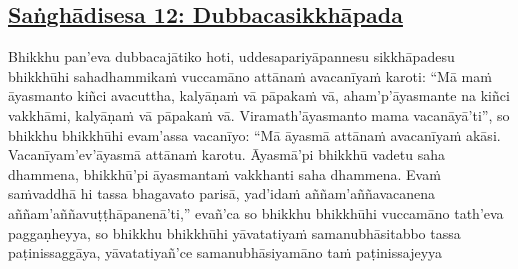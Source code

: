 


\subsection*{\hyperref[comm12]{Saṅghādisesa 12: Dubbacasikkhāpada}}
\label{sd12}

Bhikkhu pan'eva dubbacajātiko hoti, uddesapariyāpannesu sikkhāpadesu bhikkhūhi sahadhammikaṁ vuccamāno attānaṁ avacanīyaṁ karoti: ``Mā maṁ āyasmanto kiñci avacuttha, kalyāṇaṁ vā pāpakaṁ vā, aham'p'āyasmante na kiñci vakkhāmi, kalyāṇaṁ vā pāpakaṁ vā. Viramath'āyasmanto mama vacanāyā'ti'', so bhikkhu bhikkhūhi evam'assa vacanīyo:\makeatletter\hyperlink{endnote81-appendix}\makeatother{} ``Mā āyasmā\makeatletter\hyperlink{endnote82-appendix}\makeatother{} attānaṁ avacanīyaṁ akāsi. Vacanīyam'ev'āyasmā\makeatletter\hyperlink{endnote83-appendix}\makeatother{} attānaṁ karotu. Āyasmā'pi bhikkhū vadetu\makeatletter\hyperlink{endnote84-appendix}\makeatother{} saha dhammena,\makeatletter\hyperlink{endnote85-appendix}\makeatother{} bhikkhū'pi āyasmantaṁ vakkhanti saha dhammena. Evaṁ saṁvaddhā\makeatletter\hyperlink{endnote86-appendix}\makeatother{} hi tassa bhagavato parisā, yad'idaṁ aññam'aññavacanena aññam'aññavuṭṭhāpanenā'ti,'' evañ'ca so bhikkhu bhikkhūhi vuccamāno tath'eva paggaṇheyya, so bhikkhu bhikkhūhi yāvatatiyaṁ samanubhāsitabbo tassa paṭinissaggāya, yāvatatiyañ'ce samanubhāsiyamāno taṁ paṭinissajeyya\makeatletter\hyperlink{endnote87-appendix}
